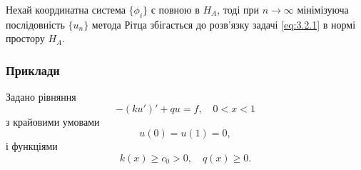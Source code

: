 \begin{theorem}
    Нехай координатна система $\{\phi_i\}$ є повною в $H_A$, тоді при $n \to \infty$ мінімізуюча послідовність $\{u_n\}$ метода Рітца збігається до розв'язку задачі \eqref{eq:3.2.1} в нормі простору $H_A$.
\end{theorem}
\subsubsection{Приклади}
\begin{example}
    Задано рівняння
    \begin{equation*}
        -(k u')' + qu = f, \quad 0 < x < 1
    \end{equation*}
    з крайовими умовами
    \begin{equation*}
        u(0) = u(1) = 0,
    \end{equation*}
    і функціями
    \begin{equation*}
        k(x) \ge c_0 > 0, \quad q(x) \ge 0.
    \end{equation*}
\end{example}

